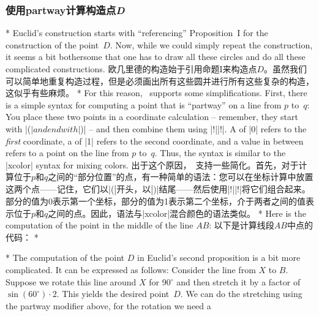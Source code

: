 \begin{paracol}{2}
\subsubsection{使用partway计算构造点\emph{D}}
\switchcolumn[0]*%
Euclid's construction starts with ``referencing'' Proposition~I for the
construction of the point~$D$. Now, while we could simply repeat the
construction, it seems a bit bothersome that one has to draw all these circles
and do all these complicated constructions.
\switchcolumn
欧几里德的构造始于引用命题I来构造点$D$。虽然我们可以简单地重复构造过程，但是必须画出所有这些圆并进行所有这些复杂的构造，这似乎有些麻烦。
\switchcolumn[0]*%
For this reason, \tikzname\ supports some simplifications. First, there is a
simple syntax for computing a point that is ``partway'' on a line from $p$
to~$q$: You place these two points in a coordinate calculation -- remember,
they start with |($| and end with |$)| -- and then combine them using
|!||!|. A  of |0| refers to the \emph{first} coordinate,
a  of |1| refers to the second coordinate, and a value in between
refers to a point on the line from $p$ to~$q$. Thus, the syntax is similar to
the |xcolor| syntax for mixing colors.
\switchcolumn
出于这个原因，\tikzname\ 支持一些简化。首先，对于计算位于$p$和$q$之间的“部分位置”的点，有一种简单的语法：您可以在坐标计算中放置这两个点——记住，它们以|($|开头，以|$)|结尾——然后使用|!||!|将它们组合起来。部分的值为0表示第一个坐标，部分的值为1表示第二个坐标，介于两者之间的值表示位于$p$和$q$之间的点。因此，语法与|xcolor|混合颜色的语法类似。
\switchcolumn[0]*%
Here is the computation of the point in the middle of the line $AB$:
\switchcolumn
以下是计算线段$AB$中点的代码：
\switchcolumn[1]*%
\begin{codeexample}[preamble={\usetikzlibrary{calc}}]
\end{codeexample}
\switchcolumn[0]*%
The computation of the point $D$ in Euclid's second proposition is a bit more
complicated. It can be expressed as follows: Consider the line from $X$ to $B$.
Suppose we rotate this line around $X$ for 90$^\circ$ and then stretch it by a
factor of $\sin(60^\circ) \cdot 2$. This yields the desired point~$D$. We can
do the stretching using the partway modifier above, for the rotation we need a

\end{paracol}
